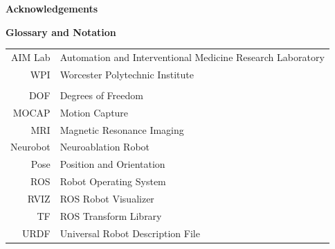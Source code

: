 \documentclass[12pt]{report}
\begin{document}


\begin{center}
	\textbf{Acknowledgements}
\end{center}


\clearpage


\tableofcontents


\listoffigures

\listoftables

\clearpage

\begin{center}
	\textbf{Glossary and Notation}
\end{center}

\begin{tabular}{rl}
	AIM Lab& Automation and Interventional Medicine Research Laboratory\\
	WPI& Worcester Polytechnic Institute\\
	\\
	DOF& Degrees of Freedom\\
	MOCAP& Motion Capture\\
    MRI& Magnetic Resonance Imaging\\
    Neurobot& Neuroablation Robot\\
	Pose& Position and Orientation\\
	ROS& Robot Operating System\\
	RVIZ& ROS Robot Visualizer \\
	TF& ROS Transform Library\\
	URDF& Universal Robot Description File\\
\end{tabular}
\end{document}
